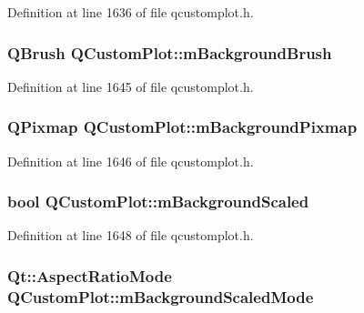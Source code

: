 Definition at line 1636 of file qcustomplot.\-h.

\hypertarget{class_q_custom_plot_a3aef5de4ac012178e3293248e9c63737}{
\subsubsection[{m\-Background\-Brush}]{\setlength{\rightskip}{0pt plus 5cm}Q\-Brush Q\-Custom\-Plot\-::m\-Background\-Brush\hspace{0.3cm}{\ttfamily [protected]}}}\label{class_q_custom_plot_a3aef5de4ac012178e3293248e9c63737}


Definition at line 1645 of file qcustomplot.\-h.

\hypertarget{class_q_custom_plot_ae8f4677399324a78c5f8dbfb95a34f90}{
\subsubsection[{m\-Background\-Pixmap}]{\setlength{\rightskip}{0pt plus 5cm}Q\-Pixmap Q\-Custom\-Plot\-::m\-Background\-Pixmap\hspace{0.3cm}{\ttfamily [protected]}}}\label{class_q_custom_plot_ae8f4677399324a78c5f8dbfb95a34f90}


Definition at line 1646 of file qcustomplot.\-h.

\hypertarget{class_q_custom_plot_a62fe584b20680b1b2e1c7efb5c5416a5}{
\subsubsection[{m\-Background\-Scaled}]{\setlength{\rightskip}{0pt plus 5cm}bool Q\-Custom\-Plot\-::m\-Background\-Scaled\hspace{0.3cm}{\ttfamily [protected]}}}\label{class_q_custom_plot_a62fe584b20680b1b2e1c7efb5c5416a5}


Definition at line 1648 of file qcustomplot.\-h.

\hypertarget{class_q_custom_plot_ab82e8a5e3ad6b486f95d6da8bf49e9aa}{
\subsubsection[{m\-Background\-Scaled\-Mode}]{\setlength{\rightskip}{0pt plus 5cm}Qt\-::\-Aspect\-Ratio\-Mode Q\-Custom\-Plot\-::m\-Background\-Scaled\-Mode\hspace{0.3cm}{\ttfamily [protected]}}}\label{class_q_custom_plot_ab82e8a5e3ad6b486f95d6da8bf49e9aa}


